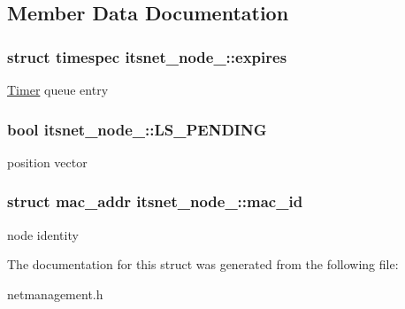 \subsection{\-Member \-Data \-Documentation}
\hypertarget{structitsnet__node___a739efa30ffaecf7f432b8b6982741914}{
\subsubsection[{expires}]{\setlength{\rightskip}{0pt plus 5cm}struct timespec {\bf itsnet\-\_\-node\-\_\-\-::expires}}}\label{structitsnet__node___a739efa30ffaecf7f432b8b6982741914}
\hyperlink{structTimer}{\-Timer} queue entry \hypertarget{structitsnet__node___a5948eabb3d13382ca03acd5daaf7892e}{
\subsubsection[{\-L\-S\-\_\-\-P\-E\-N\-D\-I\-N\-G}]{\setlength{\rightskip}{0pt plus 5cm}bool {\bf itsnet\-\_\-node\-\_\-\-::\-L\-S\-\_\-\-P\-E\-N\-D\-I\-N\-G}}}\label{structitsnet__node___a5948eabb3d13382ca03acd5daaf7892e}
position vector \hypertarget{structitsnet__node___a5e4d0612d0087ba84e9e6f5bb941d142}{
\subsubsection[{mac\-\_\-id}]{\setlength{\rightskip}{0pt plus 5cm}struct {\bf mac\-\_\-addr} {\bf itsnet\-\_\-node\-\_\-\-::mac\-\_\-id}}}\label{structitsnet__node___a5e4d0612d0087ba84e9e6f5bb941d142}
node identity 

\-The documentation for this struct was generated from the following file\-:\begin{DoxyCompactItemize}
\item 
netmanagement.\-h\end{DoxyCompactItemize}
